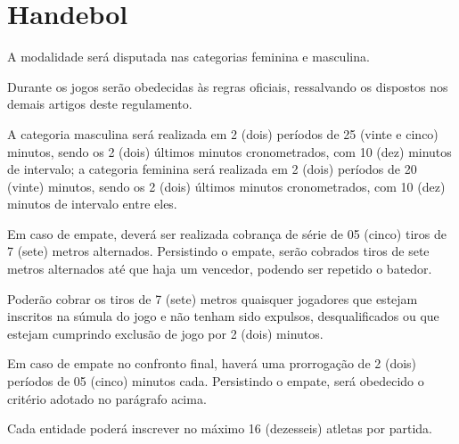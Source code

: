 {\let\clearpage\relax \chapter{Handebol}}

\begin{article}
	A modalidade será disputada nas categorias feminina e masculina.
\end{article}

\begin{article}
	Durante os jogos serão obedecidas às regras oficiais, ressalvando os dispostos nos demais artigos deste regulamento.
\end{article}

\begin{article}
	A categoria masculina será realizada em 2 (dois) períodos de 25 (vinte e cinco) minutos, sendo os 2 (dois) últimos minutos cronometrados, com 10 (dez) minutos de intervalo; a categoria feminina será realizada em 2 (dois) períodos de 20 (vinte) minutos, sendo os 2 (dois) últimos minutos cronometrados, com 10 (dez) minutos de intervalo entre eles.

	\begin{xparagraph}
		Em caso de empate, deverá ser realizada cobrança de série de 05 (cinco) tiros de 7 (sete) metros alternados. Persistindo o empate, serão cobrados tiros de sete metros alternados até que haja um vencedor, podendo ser repetido o batedor.
	\end{xparagraph}

	\begin{xparagraph}
		Poderão cobrar os tiros de 7 (sete) metros quaisquer jogadores que estejam inscritos na súmula do jogo e não tenham sido expulsos, desqualificados ou que estejam cumprindo exclusão de jogo por 2 (dois) minutos.
	\end{xparagraph}

	\begin{xparagraph}
		Em caso de empate no confronto final, haverá uma prorrogação de 2 (dois) períodos de 05 (cinco) minutos cada. Persistindo o empate, será obedecido o critério adotado no parágrafo acima.
	\end{xparagraph}
\end{article}

\begin{article}
	Cada entidade poderá inscrever no máximo 16 (dezesseis) atletas por partida.
\end{article}
